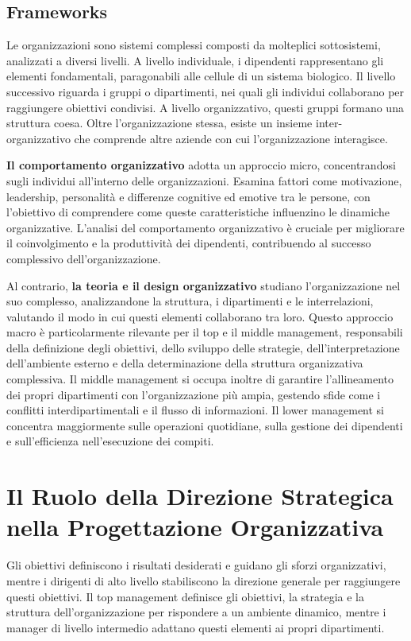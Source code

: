 \documentclass{article}
\begin{document}
\subsection{Frameworks}

Le organizzazioni sono sistemi complessi composti da molteplici sottosistemi, analizzati a diversi livelli. A livello individuale, i dipendenti rappresentano gli elementi fondamentali, paragonabili alle cellule di un sistema biologico. Il livello successivo riguarda i gruppi o dipartimenti, nei quali gli individui collaborano per raggiungere obiettivi condivisi. A livello organizzativo, questi gruppi formano una struttura coesa. Oltre l'organizzazione stessa, esiste un insieme inter-organizzativo che comprende altre aziende con cui l'organizzazione interagisce.  

\textbf{Il comportamento organizzativo} adotta un approccio micro, concentrandosi sugli individui all'interno delle organizzazioni. Esamina fattori come motivazione, leadership, personalità e differenze cognitive ed emotive tra le persone, con l'obiettivo di comprendere come queste caratteristiche influenzino le dinamiche organizzative. L'analisi del comportamento organizzativo è cruciale per migliorare il coinvolgimento e la produttività dei dipendenti, contribuendo al successo complessivo dell'organizzazione.  

Al contrario, \textbf{la teoria e il design organizzativo} studiano l'organizzazione nel suo complesso, analizzandone la struttura, i dipartimenti e le interrelazioni, valutando il modo in cui questi elementi collaborano tra loro. Questo approccio macro è particolarmente rilevante per il top e il middle management, responsabili della definizione degli obiettivi, dello sviluppo delle strategie, dell'interpretazione dell'ambiente esterno e della determinazione della struttura organizzativa complessiva. Il middle management si occupa inoltre di garantire l'allineamento dei propri dipartimenti con l'organizzazione più ampia, gestendo sfide come i conflitti interdipartimentali e il flusso di informazioni. Il lower management si concentra maggiormente sulle operazioni quotidiane, sulla gestione dei dipendenti e sull'efficienza nell'esecuzione dei compiti.  


\section{Il Ruolo della Direzione Strategica nella Progettazione Organizzativa}

Gli obiettivi definiscono i risultati desiderati e guidano gli sforzi organizzativi, mentre i dirigenti di alto livello stabiliscono la direzione generale per raggiungere questi obiettivi. Il top management definisce gli obiettivi, la strategia e la struttura dell'organizzazione per rispondere a un ambiente dinamico, mentre i manager di livello intermedio adattano questi elementi ai propri dipartimenti.  
\end{document}
